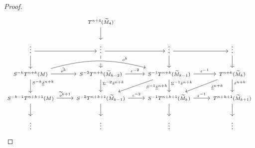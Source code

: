 \documentclass[12pt,a4paper]{article}
\numberwithin{equation}{section}
\theoremstyle{nonumberplain}
\newtheorem{proof}{Proof}
\begin{document}
\begin{proof}
\begin{equation}
\begin{tikzcd}
    & {\scriptstyle T^{n+4}(\widetilde{M}_4)} \arrow[d] \\
  {} {\scriptstyle \vdots} {} \arrow[r] \arrow[d]
    & {} {\scriptstyle \vdots} {} \arrow[r] \arrow[d]
    & {} {\scriptstyle \vdots} {} \arrow[r] \arrow[d]
    & {} {\scriptstyle \vdots} {} \arrow[d] \\
  {\scriptstyle S^{-k}T^{n+k}(M)} \arrow[r, "{\scriptscriptstyle \widetilde{o}^k}"] \arrow[rr, bend left = 15, crossing over, "{\scriptscriptstyle o^k}" near end] \arrow[d, "{\scriptscriptstyle S^{-k}\underline{\delta}^{n+k}}" near start]
    & {\scriptstyle S^{-2}T^{n+k}(\widetilde{M}_{k-2})} \arrow[r, "{\scriptscriptstyle \varepsilon^{-2}}"] \arrow[d, "{\scriptscriptstyle \Sigma^{-2}\delta^{n+k}}" near start]
    & {\scriptstyle S^{-1}T^{n+k}(\widetilde{M}_{k-1})} \arrow[r, "{\scriptscriptstyle \varepsilon^{-1}}"] \arrow[d, "{\scriptscriptstyle \Sigma^{-1}\delta^{n+k}}" near start] \arrow[dl, "{\scriptscriptstyle S^{-1}\underline{\delta}^{n+k}}" near start]
    & {\scriptstyle T^{n+k}(\widetilde{M}_k)} \arrow[d, "{\scriptscriptstyle \delta^{n+k}}" near start] \arrow[dl, "{\scriptscriptstyle \underline{\delta}^{n+k}}" near start] \\
  {\scriptstyle S^{-k-1}T^{n+k+1}(M)} \arrow[r, "{\scriptscriptstyle \widetilde{o}^{k+1}}"] \arrow[d]
    & {\scriptstyle S^{-2}T^{n+k+1}(\widetilde{M}_{k-1})} \arrow[r, "{\scriptscriptstyle \varepsilon^{-2}}"] \arrow[d]
    & {\scriptstyle S^{-1}T^{n+k+1}(\widetilde{M}_k)} \arrow[r, "{\scriptscriptstyle \varepsilon^{-1}}"] \arrow[d]
    & {\scriptstyle T^{n+k+1}(\widetilde{M}_{k+1})} \arrow[d] \\
  {} {\scriptstyle \vdots} {}
    & {} {\scriptstyle \vdots} {}
    & {} {\scriptstyle \vdots} {}
    & {} {\scriptstyle \vdots} {}
\end{tikzcd}
\end{equation}


\end{proof}
\end{document}

